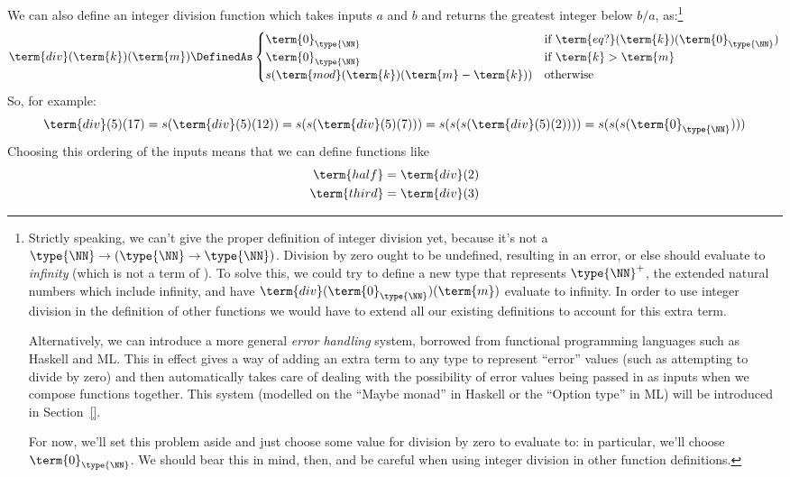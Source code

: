 


We can also define an integer division function 
which takes inputs $a$ and $b$ and returns the greatest integer below $b/a$, as:\footnote{
Strictly speaking, we can't give the proper definition of integer division yet, because it's not a  
$\type{\NN} \to (\type{\NN} \to \type{\NN})$.  Division by zero ought to be undefined, resulting in an error, or else should evaluate to \emph{infinity} (which is not a term of \type{\NN}).  To solve this, we could try to define a new type that represents $\type{\NN}^{+}$, the extended natural numbers which include infinity, and have $\term{div}
(\term{0}_{\type{\NN}})
(\term{m})$ evaluate to infinity.  In order to use integer division in the definition of other functions we would have to extend all our existing definitions to account for this extra term.

Alternatively, we can introduce a more general \emph{error handling} system, borrowed from functional programming languages such as Haskell and ML.  This in effect gives a way of adding an extra term to any type to represent ``error'' values (such as attempting to divide by zero) and then automatically takes care of dealing with the possibility of error values being passed in as inputs when we compose functions together.  This system (modelled on the ``Maybe monad'' in Haskell or the ``Option type'' in ML) will be introduced in Section~\ref{}.

For now, we'll set this problem aside and just choose some value for division by zero to evaluate to: in particular, we'll choose $\term{0}_{\type{\NN}}$.  We should bear this in mind, then, and be careful when using integer division in other function definitions.
}
\[
\term{div}
(\term{k})
(\term{m}) 
\DefinedAs
\begin{cases}
\term{0}_{\type{\NN}}
	&\mbox{if } \term{eq?}(\term{k})(\term{0}_{\type{\NN}})
\\
\term{0}_{\type{\NN}}
	&\mbox{if } \term{k} > \term{m}
\\
s(\term{mod}
(\term{k})
(\term{m} - \term{k} ))
	&\mbox{otherwise}
\end{cases}
\]
%
So, for example:
\[
\term{div}(5)(17) = 
s(\term{div}(5)(12)) = 
s(s(\term{div}(5)(7))) = 
s(s(s(\term{div}(5)(2)))) = 
s(s(s(\term{0}_{\type{\NN}})))
\]
Choosing this ordering of the inputs means that we can define functions like 
\begin{align*}
\term{half}  &= \term{div}(2) \\
\term{third} &= \term{div}(3)
\end{align*}



